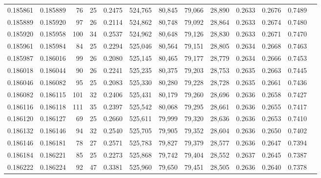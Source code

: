 \begin{tabular}{rrrrrrrrrrrrr}
0.185861 & 0.185889 &    76 &  25 &                                     0.2475 & 524,765 &  80,845 &  79,066 &  28,890 & 0.2633 & 0.2676 & 0.7489 \\
0.185889 & 0.185920 &    97 &  26 &                                     0.2114 & 524,862 &  80,748 &  79,092 &  28,864 & 0.2633 & 0.2674 & 0.7480 \\
0.185920 & 0.185958 &   100 &  34 &                                     0.2537 & 524,962 &  80,648 &  79,126 &  28,830 & 0.2633 & 0.2671 & 0.7470 \\
0.185961 & 0.185984 &    84 &  25 &                                     0.2294 & 525,046 &  80,564 &  79,151 &  28,805 & 0.2634 & 0.2668 & 0.7463 \\
0.185987 & 0.186016 &    99 &  26 &                                     0.2080 & 525,145 &  80,465 &  79,177 &  28,779 & 0.2634 & 0.2666 & 0.7453 \\
0.186018 & 0.186044 &    90 &  26 &                                     0.2241 & 525,235 &  80,375 &  79,203 &  28,753 & 0.2635 & 0.2663 & 0.7445 \\
0.186046 & 0.186082 &    95 &  25 &                                     0.2083 & 525,330 &  80,280 &  79,228 &  28,728 & 0.2635 & 0.2661 & 0.7436 \\
0.186082 & 0.186115 &   101 &  32 &                                     0.2406 & 525,431 &  80,179 &  79,260 &  28,696 & 0.2636 & 0.2658 & 0.7427 \\
0.186116 & 0.186118 &   111 &  35 &                                     0.2397 & 525,542 &  80,068 &  79,295 &  28,661 & 0.2636 & 0.2655 & 0.7417 \\
0.186120 & 0.186127 &    69 &  25 &                                     0.2660 & 525,611 &  79,999 &  79,320 &  28,636 & 0.2636 & 0.2653 & 0.7410 \\
0.186132 & 0.186146 &    94 &  32 &                                     0.2540 & 525,705 &  79,905 &  79,352 &  28,604 & 0.2636 & 0.2650 & 0.7402 \\
0.186146 & 0.186181 &    78 &  27 &                                     0.2571 & 525,783 &  79,827 &  79,379 &  28,577 & 0.2636 & 0.2647 & 0.7394 \\
0.186184 & 0.186221 &    85 &  25 &                                     0.2273 & 525,868 &  79,742 &  79,404 &  28,552 & 0.2637 & 0.2645 & 0.7387 \\
0.186222 & 0.186224 &    92 &  47 &                                     0.3381 & 525,960 &  79,650 &  79,451 &  28,505 & 0.2636 & 0.2640 & 0.7378 \\

\end{tabular}
